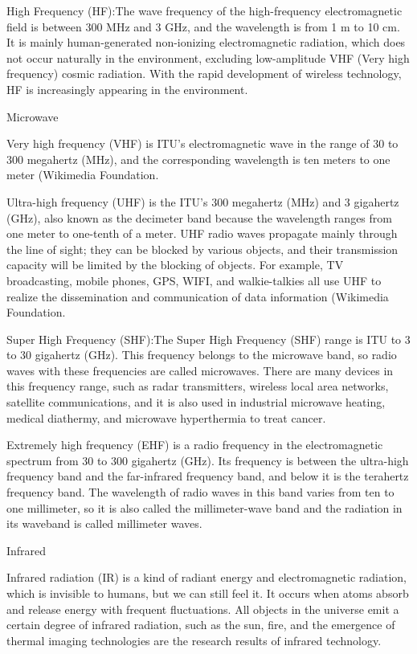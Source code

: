 \documentclass[conference]{IEEEtran}
\newcommand{\subparagraph}{}
\begin{document}
	High Frequency (HF):The wave frequency of the high-frequency electromagnetic field is between 300 MHz and 3 GHz, and the 
	wavelength is from 1 m to 10 cm. It is mainly human-generated non-ionizing electromagnetic radiation, which does not occur 
	naturally in the environment, excluding low-amplitude VHF (Very high frequency) cosmic radiation. With the rapid development 
	of wireless technology, HF is increasingly appearing in the environment.

	\subparagraph{Microwave}
	
	Very high frequency (VHF) is ITU's electromagnetic wave in the range of 30 to 300 megahertz (MHz), and the corresponding 
	wavelength is ten meters to one meter (Wikimedia Foundation\cite{Veryhigh48:online}.
	
	Ultra-high frequency (UHF) is the ITU's 300 megahertz (MHz) and 3 gigahertz (GHz), also known as the decimeter band because 
	the wavelength ranges from one meter to one-tenth of a meter. UHF radio waves propagate mainly through the line of sight; 
	they can be blocked by various objects, and their transmission capacity will be limited by the blocking of objects. For example, 
	TV broadcasting, mobile phones, GPS, WIFI, and walkie-talkies all use UHF to realize the dissemination and communication of data 
	information (Wikimedia Foundation\cite{Ultrahig37:online}.
	
	Super High Frequency (SHF):The Super High Frequency (SHF) range is ITU to 3 to 30 gigahertz (GHz). This frequency belongs to 
	the microwave band, so radio waves with these frequencies are called microwaves. There are many devices in this frequency range, 
	such as radar transmitters, wireless local area networks, satellite communications, and it is also used in industrial microwave 
	heating, medical diathermy, and microwave hyperthermia to treat cancer\cite{Superhig8:online}.
	
	Extremely high frequency (EHF) is a radio frequency in the electromagnetic spectrum from 30 to 300 gigahertz (GHz). Its frequency 
	is between the ultra-high frequency band and the far-infrared frequency band, and below it is the terahertz frequency band. The 
	wavelength of radio waves in this band varies from ten to one millimeter, so it is also called the millimeter-wave band and the 
	radiation in its waveband is called millimeter waves\cite{Extremel31:online}.

	\subparagraph{Infrared}
	
	Infrared radiation (IR) is a kind of radiant energy and electromagnetic radiation, which is invisible to humans, but we can 
	still feel it. It occurs when atoms absorb and release energy with frequent fluctuations. All objects in the universe emit a 
	certain degree of infrared radiation, such as the sun, fire, and the emergence of thermal imaging technologies are the research 
	results of infrared technology\cite{L40416:online}.
\end{document}

